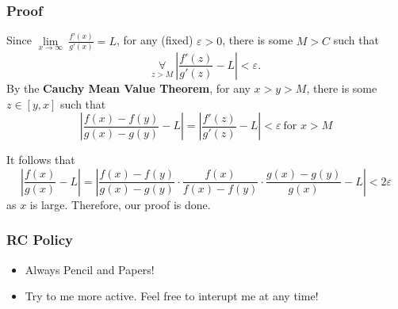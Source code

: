 \documentclass{beamer}
\begin{document}
\begin{frame}
    \frametitle{Proof}

\hspace{1em}
Since $\underset{x\rightarrow \infty }{\lim}\ \frac{f'(x)}{g'(x)}=L$, for any (fixed) $\varepsilon>0$, there is some $M>C$ such that 
\begin{equation*}
    \underset{z>M}{\forall}\ |\frac{f'(z)}{g'(z)}-L|<\varepsilon.
\end{equation*}
 By the \textbf{Cauchy Mean Value Theorem}, for any $x>y>M$, there is some $z\in[y,x]$ such that 
\begin{equation*}
    |\frac{f(x)-f(y)}{g(x)-g(y)}-L|=|\frac{f'(z)}{g'(z)}-L|<\varepsilon\ \text{for }x>M
\end{equation*}

It follows that 
\begin{equation*}
    |\frac{f(x)}{g(x)}-L|=|\frac{f(x)-f(y)}{g(x)-g(y)}\cdot\frac{f(x)}{f(x)-f(y)}\cdot\frac{g(x)-g(y)}{g(x)}-L|<2\varepsilon
\end{equation*}
as $x$ is large. Therefore, our proof is done.



\end{frame}
\begin{frame}
    \frametitle{RC Policy}
    \begin{itemize}
        \item Always Pencil and Papers!
        \item Try to me more active. Feel free to interupt me at any time!
    \end{itemize}
    \begin{figure}
    \end{figure}
\end{frame}
\end{document}

